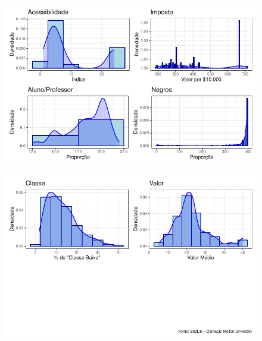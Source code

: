\documentclass[
  letterpaper,
]{report}
\begin{document}
\begin{figure}[H]

{\centering \includegraphics{Parte-1_files/figure-pdf/unnamed-chunk-3-3.pdf}

}

\end{figure}

\begin{figure}[H]

{\centering \includegraphics{Parte-1_files/figure-pdf/unnamed-chunk-3-4.pdf}

}

\end{figure}
\end{document}
